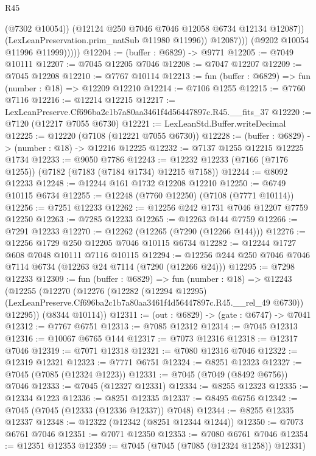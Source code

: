 \begin{lexlean}{R45}
\begin{coremodule}
{                        (@7302 @10054))
                      (@12124 @250 @7046 @7046 @12058 @6734 @12134 @12087))
                    (LexLeanPreservation.prim_natSub @11980 @11996))
                  @12087)))
            (@9202 @10054 @11996 @11999)))))
@12204 := (buffer : @6829) -> @9771
@12205 := @7049 @10111
@12207 := @7045 @12205 @7046
@12208 := @7047 @12207
@12209 := @7045 @12208
@12210 := @7767 @10114
@12213 := fun (buffer : @6829) => fun (number : @18) => @12209 @12210
@12214 := @7106 @1255
@12215 := @7760 @7116
@12216 := @12214 @12215
@12217 := LexLeanPreserve.Cf696ba2c1b7a80aa3461f4d56447897c.R45.__fits_37
@12220 := @7120 (@12217 @7055 @6730)
@12221 := LexLeanStd.Buffer.writeDecimal
@12225 := @12220 (@7108 (@12221 @7055 @6730))
@12228 := (buffer : @6829) -> (number : @18) -> @12216 @12225
@12232 := @7137 @1255 @12215 @12225 @1734
@12233 := @9050 @7786
@12243 := @12232 @12233 (@7166 (@7176 @1255)) (@7182 (@7183 (@7184 @1734) @12215 @7158))
@12244 := @8092 @12233
@12248 := @12244 @161 @1732 @12208 @12210
@12250 := @6749 @10115 @6734
@12255 := @12248 (@7760 @12250) (@7108 (@7771 @10114))
@12256 := @7251 @12233
@12262 := @12256 @242 @1731 @7046 @12207 @7759 @12250
@12263 := @7285 @12233
@12265 := @12263 @144 @7759
@12266 := @7291 @12233
@12270 := @12262 (@12265 (@7290 (@12266 @144)))
@12276 := @12256 @1729 @250 @12205 @7046 @10115 @6734
@12282 := @12244 @1727 @608 @7048 @10111 @7116 @10115
@12294 := @12256 @244 @250 @7046 @7046 @7114 @6734 (@12263 @24 @7114 (@7290 (@12266 @24)))
@12295 := @7298 @12233
@12309 := fun (buffer : @6829) =>
  fun (number : @18) =>
  @12243
    (@12255
      (@12270
        (@12276
          (@12282
            (@12294 @12295)
            (LexLeanPreserve.Cf696ba2c1b7a80aa3461f4d56447897c.R45.__rel_49 @6730))
          @12295))
      (@8344 @10114))
@12311 := (out : @6829) -> (gate : @6747) -> @7041
@12312 := @7767 @6751
@12313 := @7085 @12312
@12314 := @7045 @12313
@12316 := @10067 @6765 @144
@12317 := @7073 @12316
@12318 := @12317 @7046
@12319 := @7071 @12318
@12321 := @7080 @12316 @7046
@12322 := @12319 @12321
@12323 := @7771 @6751
@12324 := @8251 @12323
@12327 := @7045 (@7085 (@12324 @1223))
@12331 := @7045 (@7049 (@8492 @6756)) @7046
@12333 := @7045 (@12327 @12331)
@12334 := @8255 @12323
@12335 := @12334 @1223
@12336 := @8251 @12335
@12337 := @8495 @6756
@12342 := @7045 (@7045 (@12333 (@12336 @12337)) @7048)
@12344 := @8255 @12335 @12337
@12348 := @12322 (@12342 (@8251 @12344 @1244))
@12350 := @7073 @6761 @7046
@12351 := @7071 @12350
@12353 := @7080 @6761 @7046
@12354 := @12351 @12353
@12359 := @7045 (@7045 (@7085 (@12324 @1258)) @12331)
}
\end{coremodule}
\end{lexlean}
